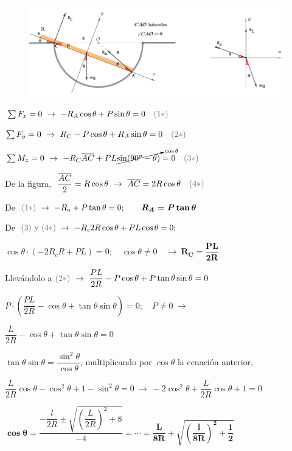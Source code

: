 \begin{figure}[H]
	\centering
	\includegraphics[width=1.1\textwidth]{imagenes/imagenes06/T06IM14.png}
\end{figure}

$\sum F_x=0 \ \to \ -R_A \cos \theta + P \sin \theta =0 \quad \textcolor{gris}{(1*)}$

$\sum F_y=0 \ \to \ R_C-P\cos \theta+R_A \sin \theta=0 \quad \textcolor{gris}{(2*)}$

$\sum M_z=0 \ \to \ -R_C \overline{AC} + PL \cancelto{\cos \theta}{\sin(90^o-\theta)}=0 \quad \textcolor{gris}{(3*)}$

De la figura, $\ \dfrac{\overline{AC}}{2}=R \cos \theta \ \to \ \overline{AC}=2R\cos \theta \quad \textcolor{gris}{(4*)}$

De $\textcolor{gris}{(1*)} \ \to \ -R_a+P\tan \theta = 0;\qquad \boldsymbol{R_A=P \tan \theta}$

De $\textcolor{gris}{(3) \text{ y } (4*)} \ \to \ -R_c 2R \cos \theta + PL \cos \theta = 0;$

$ \cos \theta \cdot \left( -2R_cR+PL \right) =0; \quad \cos \theta \neq 0 \quad  \to \ \boldsymbol{R_C=\dfrac{PL}{2R}}$

Llevándolo a $\textcolor{gris}{(2*)} \ \to \ \dfrac {PL}{2R} - P \cos \theta + P \tan \theta \sin \theta = 0$

$P\cdot \left( \dfrac {PL}{2R} - \cos \theta +  \tan \theta \sin \theta \right) = 0; \quad  P\neq 0 \ \to$

$\dfrac {L}{2R} - \cos \theta +  \tan \theta \sin \theta = 0 $

$ \tan \theta \sin \theta = \dfrac{\sin^2 \theta}{\cos \theta}$, multiplicando por $\cos \theta$ la ecuación anterior,

 $\dfrac {L}{2R} \cos \theta - \cos^2 \theta + 1- \sin^2 \theta =0 \ \to \ -2\cos^2 \theta + \dfrac L{2R} \cos \theta + 1 = 0$
 
 $\boldsymbol{\cos \theta=} \dfrac{-\dfrac{l}{2R} \pm \sqrt{\left(\dfrac{L}{2R}\right)^2 + 8} }{-4}=\cdots =\boldsymbol{
 \dfrac L {8R} + \sqrt{\left( \dfrac{l}{8R} \right)^2 + \dfrac 1 2} }$


